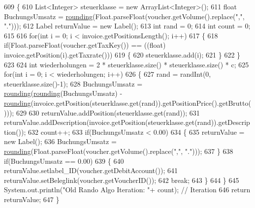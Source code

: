 \begin{DoxyCode}
609     \{
610         List<Integer> steuerklasse = \textcolor{keyword}{new} ArrayList<Integer>();
611         \textcolor{keywordtype}{float} BuchungsUmsatz = \hyperlink{class_booking_1_1_c_s_v_booking_handler_acbde555759b0d5d7b8dd07b6da253083}{rounding}(Float.parseFloat(voucher.getVolume().replace(\textcolor{stringliteral}{","}, \textcolor{stringliteral}{"."})));
612         Label returnValue = \textcolor{keyword}{new} Label();
613         \textcolor{keywordtype}{int} rand = 0;
614         \textcolor{keywordtype}{int} count = 0;
615         
616         \textcolor{keywordflow}{for}(\textcolor{keywordtype}{int} i = 0; i < invoice.getPositionsLength(); i++)
617         \{
618             \textcolor{keywordflow}{if}(Float.parseFloat(voucher.getTaxKey()) == ((\textcolor{keywordtype}{float}) invoice.getPosition(i).getTaxrate()))
619             \{
620                 steuerklasse.add(i);
621             \}
622         \}
623         
624         \textcolor{keywordtype}{int} wiederholungen = 2 * steuerklasse.size() * steuerklasse.size() * c;
625         \textcolor{keywordflow}{for}(\textcolor{keywordtype}{int} i = 0; i < wiederholungen; i++)
626         \{
627             rand = randInt(0, steuerklasse.size()-1);
628             BuchungsUmsatz = \hyperlink{class_booking_1_1_c_s_v_booking_handler_acbde555759b0d5d7b8dd07b6da253083}{rounding}(\hyperlink{class_booking_1_1_c_s_v_booking_handler_acbde555759b0d5d7b8dd07b6da253083}{rounding}(BuchungsUmsatz) - 
      \hyperlink{class_booking_1_1_c_s_v_booking_handler_acbde555759b0d5d7b8dd07b6da253083}{rounding}(invoice.getPosition(steuerklasse.get(rand)).getPositionPrice().getBrutto()));
629             
630             returnValue.addPosition(steuerklasse.get(rand));
631             returnValue.addDescription(invoice.getPosition(steuerklasse.get(rand)).getDescription());
632             count++;
633             \textcolor{keywordflow}{if}(BuchungsUmsatz < 0.00)
634             \{
635                 returnValue = \textcolor{keyword}{new} Label();
636                 BuchungsUmsatz = \hyperlink{class_booking_1_1_c_s_v_booking_handler_acbde555759b0d5d7b8dd07b6da253083}{rounding}(Float.parseFloat(voucher.getVolume().replace(\textcolor{stringliteral}{","}, \textcolor{stringliteral}{"."})));
637             \}
638             \textcolor{keywordflow}{if}(BuchungsUmsatz == 0.00)
639             \{
640                 returnValue.setlabel\_ID(voucher.getDebitAccount());
641                 returnValue.setBeleglink(voucher.getVoucherID());
642                 \textcolor{keywordflow}{break};
643             \}
644         \}
645         System.out.println(\textcolor{stringliteral}{"Old Rando Algo Iteration: "}+ count); \textcolor{comment}{// Iteration}
646         \textcolor{keywordflow}{return} returnValue;
647     \}
\end{DoxyCode}

